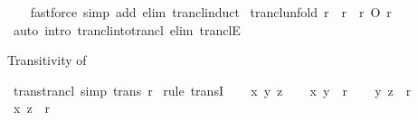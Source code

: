 \begin{isabellebody}
%
\isadelimproof
\ \ %
\endisadelimproof
%
\isatagproof
{}\isamarkupfalse%
\ {\isacharparenleft}{\kern0pt}fastforce\ simp\ add{\isacharcolon}{\kern0pt}\ elim{\isacharcolon}{\kern0pt}\ trancl{\isacharunderscore}{\kern0pt}induct{\isacharparenright}{\kern0pt}%
\endisatagproof
{\isafoldproof}%
%
\isadelimproof
\isanewline
%
\endisadelimproof
\isanewline
{}\isamarkupfalse%
\ trancl{\isacharunderscore}{\kern0pt}unfold{\isacharcolon}{\kern0pt}\ {\isachardoublequoteopen}r\isactrlsup {\isacharplus}{\kern0pt}\ {\isacharequal}{\kern0pt}\ r\ {\isasymunion}\ r\isactrlsup {\isacharplus}{\kern0pt}\ O\ r{\isachardoublequoteclose}\isanewline
%
\isadelimproof
\ \ %
\endisadelimproof
%
\isatagproof
{}\isamarkupfalse%
\ {\isacharparenleft}{\kern0pt}auto\ intro{\isacharcolon}{\kern0pt}\ trancl{\isacharunderscore}{\kern0pt}into{\isacharunderscore}{\kern0pt}trancl\ elim{\isacharcolon}{\kern0pt}\ tranclE{\isacharparenright}{\kern0pt}%
\endisatagproof
{\isafoldproof}%
%
\isadelimproof
%
\endisadelimproof
%
\begin{isamarkuptext}%
Transitivity of %
\end{isamarkuptext}\isamarkuptrue%
\isamarkupfalse%
\ trans{\isacharunderscore}{\kern0pt}trancl\ {\isacharbrackleft}{\kern0pt}simp{\isacharbrackright}{\kern0pt}{\isacharcolon}{\kern0pt}\ {\isachardoublequoteopen}trans\ {\isacharparenleft}{\kern0pt}r\isactrlsup {\isacharplus}{\kern0pt}{\isacharparenright}{\kern0pt}{\isachardoublequoteclose}\isanewline
%
\isadelimproof
%
\endisadelimproof
%
\isatagproof
{}\isamarkupfalse%
\ {\isacharparenleft}{\kern0pt}rule\ transI{\isacharparenright}{\kern0pt}\isanewline
\ \ \isamarkupfalse%
\ x\ y\ z\isanewline
\ \ \isamarkupfalse%
\ {\isachardoublequoteopen}{\isacharparenleft}{\kern0pt}x{\isacharcomma}{\kern0pt}\ y{\isacharparenright}{\kern0pt}\ {\isasymin}\ r\isactrlsup {\isacharplus}{\kern0pt}{\isachardoublequoteclose}\isanewline
\ \ \isamarkupfalse%
\ {\isachardoublequoteopen}{\isacharparenleft}{\kern0pt}y{\isacharcomma}{\kern0pt}\ z{\isacharparenright}{\kern0pt}\ {\isasymin}\ r\isactrlsup {\isacharplus}{\kern0pt}{\isachardoublequoteclose}\isanewline
\ \ \isamarkupfalse%
\ \isamarkupfalse%
\ {\isachardoublequoteopen}{\isacharparenleft}{\kern0pt}x{\isacharcomma}{\kern0pt}\ z{\isacharparenright}{\kern0pt}\ {\isasymin}\ r\isactrlsup {\isacharplus}{\kern0pt}{\isachardoublequoteclose}\isanewline
\ \ \isamarkupfalse%

\end{isabellebody}
